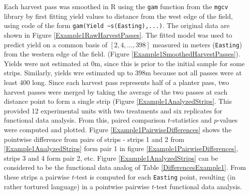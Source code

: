\documentclass[phdcss]{SDSUThesis}
\begin{document}
Each harvest pass was smoothed in R using the \texttt{gam} function from the \texttt{mgcv} library by first fitting yield values to distance from the west edge of the field, using code of the form \texttt{gam(Yield \textasciitilde s(Easting),...)}. The original data are shown in Figure \ref{Example1RawHarvestPasses}. The fitted model was used to predict yield on a common basis of $[2,4,\dots, 398]$ measured in meters (\texttt{Easting}) from the western edge of the field. (Figure \ref{Example1SmoothedHarvestPasses}). Yields were not estimated at 0m, since this is prior to the initial sample for some strips. Similarly, yields wre estimated up to 398m because not all passes were at least 400 long. Since each harvest pass represents half of a planter pass, two harvest passes were merged by taking the average of the two passes at each distance point to form a single strip (Figure \ref{Example1AnalyzedStrips}. This provided 12 experimental units with two treatments and six replicates for functional data analysis. From this, paired comparison $t$-statistics and $p$-values were computed and plotted. Figure \ref{Example1PairwiseDifferences} shows the pointwise difference from pairs of strips - strips 1 and 2 from \ref{Example1AnalyzedStrips} form pair 1 in figure \ref{Example1PairwiseDifferences}, strips 3 and 4 form pair 2, etc. Figure \ref{Example1AnalyzedStrips} can be considered to be the functional data analog of Table \ref{DifferencesExample1}. From these strips a pairwise $t$-test is computed for each \texttt{Easting} point, resulting (in rather tortured language) in a pointwise pairwise $t$-test functional data analysis.

\end{document}
